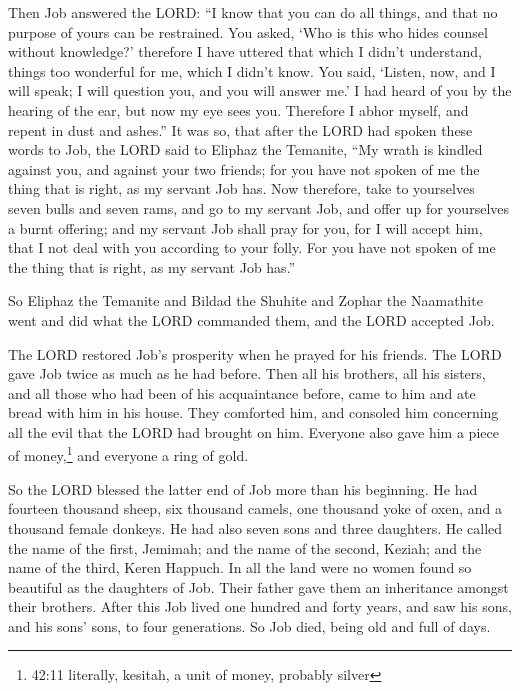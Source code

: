  Then Job answered the LORD:  ``I know that you
can do all things, and that no purpose of yours can be restrained.
 You asked, `Who is this who hides counsel without
knowledge?' therefore I have uttered that which I didn't understand,
things too wonderful for me, which I didn't know.  You said,
`Listen, now, and I will speak; I will question you, and you will answer
me.'  I had heard of you by the hearing of the ear, but now
my eye sees you.  Therefore I abhor myself, and repent in
dust and ashes.''  It was so, that after the LORD had spoken
these words to Job, the LORD said to Eliphaz the Temanite, ``My wrath is
kindled against you, and against your two friends; for you have not
spoken of me the thing that is right, as my servant Job has.
 Now therefore, take to yourselves seven bulls and seven
rams, and go to my servant Job, and offer up for yourselves a burnt
offering; and my servant Job shall pray for you, for I will accept him,
that I not deal with you according to your folly. For you have not
spoken of me the thing that is right, as my servant Job has.''

 So Eliphaz the Temanite and Bildad the Shuhite and Zophar
the Naamathite went and did what the LORD commanded them, and the LORD
accepted Job.

 The LORD restored Job's prosperity when he prayed for his
friends. The LORD gave Job twice as much as he had before. 
Then all his brothers, all his sisters, and all those who had been of
his acquaintance before, came to him and ate bread with him in his
house. They comforted him, and consoled him concerning all the evil that
the LORD had brought on him. Everyone also gave him a piece of
money,\footnote{42:11 literally, kesitah, a unit of money, probably
  silver} and everyone a ring of gold.

 So the LORD blessed the latter end of Job more than his
beginning. He had fourteen thousand sheep, six thousand camels, one
thousand yoke of oxen, and a thousand female donkeys.  He
had also seven sons and three daughters.  He called the
name of the first, Jemimah; and the name of the second, Keziah; and the
name of the third, Keren Happuch.  In all the land were no
women found so beautiful as the daughters of Job. Their father gave them
an inheritance amongst their brothers.  After this Job
lived one hundred and forty years, and saw his sons, and his sons' sons,
to four generations.  So Job died, being old and full of
days.

